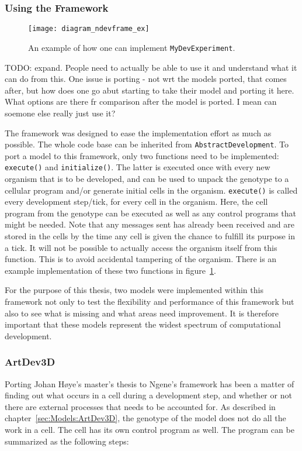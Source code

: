 \subsubsection{Using the Framework}
\begin{figure}[!ht]
	\centering
	\texttt{[image: diagram\_ndevframe\_ex]}
	\caption{An example of how one can implement \texttt{MyDevExperiment}.}
	\label{fig:diagram_ndevframe_ex}
\end{figure}

TODO:
expand. People need to actually be able to use it and understand what it can do from this. One issue is porting - not wrt the models ported, that comes after, but how does one go abut starting to take their model and porting it here. What options are there fr comparison after the model is ported. I mean can soemone else really just use it?

The framework was designed to ease the implementation effort as much as possible. The whole code base can be inherited from \texttt{AbstractDevelopment}. To port a model to this framework, only two functions need to be implemented: \texttt{execute()} and \texttt{initialize()}. The latter is executed once with every new organism that is to be developed, and can be used to unpack the genotype to a cellular program and/or generate initial cells in the organism. \texttt{execute()} is called every development step/tick, for every cell in the organism. Here, the cell program from the genotype can be executed as well as any control programs that might be needed. Note that any messages sent has already been received and are stored in the cells by the time any cell is given the chance to fulfill its purpose in a tick. It will not be possible to actually access the organism itself from this function. This is to avoid accidental tampering of the organism. There is an example implementation of these two functions in figure~\ref{fig:diagram_ndevframe_ex}.

For the purpose of this thesis, two models were implemented within this framework not only to test the flexibility and performance of this framework but also to see what is missing and what areas need improvement. It is therefore important that these models represent the widest spectrum of computational development.


\subsubsection{ArtDev3D}
\label{sec:Implementation:ArtDev3D}
Porting Johan H{\o}ye's master's thesis\cite{hoye2006} to Ngene's framework has been a matter of finding out what occurs in a cell during a development step, and whether or not there are external processes that needs to be accounted for. As described in chapter~\ref{sec:Models:ArtDev3D}, the genotype of the model does not do all the work in a cell. The cell has its own control program as well. The program can be summarized as the following steps:

